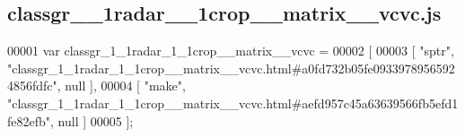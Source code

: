\subsection{classgr\+\_\+\_\+1radar\+\_\+\_\+1crop\+\_\+\+\_\+matrix\+\_\+\+\_\+vcvc.\+js}
\label{classgr__1__1radar__1__1crop____matrix____vcvc_8js_source}

\begin{DoxyCode}
00001 var classgr_1_1radar_1_1crop__matrix__vcvc =
00002 [
00003     [ \textcolor{stringliteral}{"sptr"}, \textcolor{stringliteral}{"classgr\_1\_1radar\_1\_1crop\_\_matrix\_\_vcvc.html#a0fd732b05fe09339789565924856fdfc"}, null ],
00004     [ \textcolor{stringliteral}{"make"}, \textcolor{stringliteral}{"classgr\_1\_1radar\_1\_1crop\_\_matrix\_\_vcvc.html#aefd957c45a63639566fb5efd1fe82efb"}, null ]
00005 ];
\end{DoxyCode}
